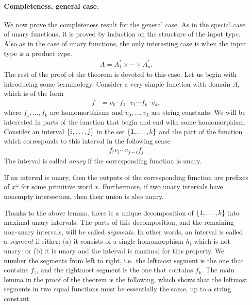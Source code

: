 \paragraph*{Completeness, general case.} We now prove the completeness result for the general case. As in the special case of unary functions, it is proved by induction on the structure of the input type. Also as in the case of unary functions, the only interesting case is when the input type is a product type. 
\begin{align}\label{eq:product-input-type}
A = A_1^* \times \cdots \times A_n^*.
\end{align}
The rest of the proof of the theorem is devoted to this case.
Let us begin with introducing some terminology. Consider a very simple function with domain $A$, which is of the form 
\begin{align*}
f & = v_0  \cdot f_1 \cdot  v_1 \cdots f_k \cdot v_k,
\end{align*}
where $f_1,\ldots,f_k$ are homomorphisms and $v_0,\ldots,v_k$ are string constants. We will be interested in parts of the function that begin and end with some homomorphism.
Consider an interval $\{i,\ldots,j\}$ in the set $\{1,\ldots,k\}$ and the part of the function which corresponds to this interval in the following sense
\begin{align*}
 f_i v_i \cdots v_{j-i} f_j 
\end{align*}
The interval is called \emph{unary} if the  corresponding function is unary. 
\begin{lemma}\label{lem:cyclic-intervals-lemma}
    If an interval is unary, then the outputs of the corresponding  function  are prefixes of $x^\omega$ for some primitive word $x$. Furthermore, if two unary intervals have nonempty intersection, then their union is also unary.
\end{lemma}
Thanks to the above lemma, there is a unique decomposition of $\{1,\ldots,k\}$ into maximal unary intervals. The parts of this decomposition, and the remaining non-unary intervals, will be called \emph{segments}. In other words, an interval is called  a \emph{segment} if either: (a) it consists of a single homomorphism $h_i$ which is not unary; or (b) it is unary and the interval is maximal for this property.  We number the segments from left to right, i.e.~the leftmost segment is the one that contains $f_1$, and the rightmost segment is the one that contains $f_k$. The main lemma in the proof of the theorem is the following, which shows that the leftmost segments in two equal functions must be essentially the same, up to a string constant.


